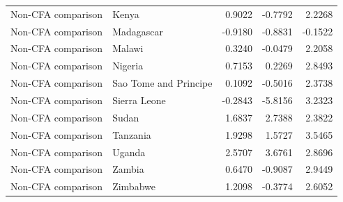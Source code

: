 \begin{table}
\begin{tabular}[t]{llrrr}
Non-CFA comparison & Kenya & 0.9022 & -0.7792 & 2.2268\\
\addlinespace
Non-CFA comparison & Madagascar & -0.9180 & -0.8831 & -0.1522\\
Non-CFA comparison & Malawi & 0.3240 & -0.0479 & 2.2058\\
Non-CFA comparison & Nigeria & 0.7153 & 0.2269 & 2.8493\\
Non-CFA comparison & Sao Tome and Principe & 0.1092 & -0.5016 & 2.3738\\
Non-CFA comparison & Sierra Leone & -0.2843 & -5.8156 & 3.2323\\
\addlinespace
Non-CFA comparison & Sudan & 1.6837 & 2.7388 & 2.3822\\
Non-CFA comparison & Tanzania & 1.9298 & 1.5727 & 3.5465\\
Non-CFA comparison & Uganda & 2.5707 & 3.6761 & 2.8696\\
Non-CFA comparison & Zambia & 0.6470 & -0.9087 & 2.9449\\
Non-CFA comparison & Zimbabwe & 1.2098 & -0.3774 & 2.6052\\
\bottomrule
\end{tabular}
\end{table}